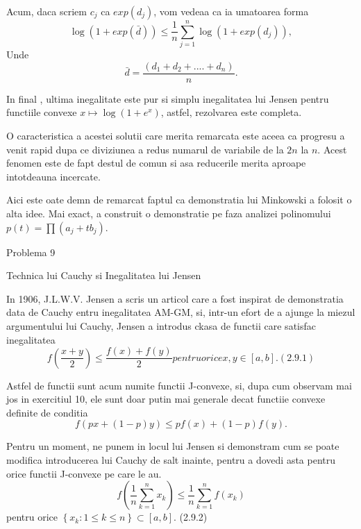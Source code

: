 \documentclass[a4paper,12pt,oneside]{report}
\begin{document}
Acum, daca scriem \(c_{j}\) ca \(exp\left (d _{j} \right )\), vom vedeaa ca ia umatoarea forma 
\begin{displaymath}
  \log\left ( 1 + exp\left ( \bar{d} \right ) \right ) \leq \frac{1}{n}\sum_{j = 1}^{n}\log\left ( 1 + exp\left ( d_{j} \right ) \right ),
\end{displaymath}
Unde 
\begin{displaymath}
  \bar{d} = \frac{\left ( d_{1} + d_{2}  + ....+ d_{n}\right )}{n}.
\end{displaymath} 

In final , ultima inegalitate este pur si simplu inegalitatea lui Jensen pentru functiile convexe \(x \mapsto \log \left ( 1 + e^{x} \right )\), astfel, rezolvarea este completa. 

O caracteristica a acestei solutii care merita remarcata este aceea ca progresu a venit rapid dupa ce diviziunea a redus numarul de variabile de la \(2n\) la \(n\). Acest fenomen este de fapt destul de comun si asa reducerile merita aproape intotdeauna incercate. 

Aici este oate demn de remarcat faptul ca demonstratia lui Minkowski a folosit o alta idee. Mai exact, a construit o demonstratie pe faza analizei polinomului \(p\left ( t \right ) = \prod \left ( a_{j}  + tb_{j}\right )\).

Problema 9 

Technica lui Cauchy si Inegalitatea lui Jensen

In 1906, J.L.W.V. Jensen a scris un articol care a fost inspirat de demonstratia data de Cauchy entru inegalitatea AM-GM, si, intr-un efort de a ajunge la miezul argumentului lui Cauchy, Jensen a introdus ckasa de functii care satisfac inegalitatea 
\begin{displaymath}
  f\left ( \frac{x + y}{2} \right ) \leq \frac{f\left ( x \right ) + f\left ( y \right )}{2} pentru orice x,y \in \left [ a, b \right ]. (2.9.1)
\end{displaymath}

Astfel de functii sunt acum numite functii J-convexe, si, dupa cum observam mai jos in exercitiul 10, ele sunt doar putin mai generale decat functiie convexe definite de conditia
\begin{displaymath}
  f\left ( px + \left ( 1 - p \right )y \right )\leq pf\left ( x \right ) + \left ( 1-p \right )f\left ( y \right ). 
\end{displaymath} 

Pentru un moment, ne punem in locul lui Jensen si demonstram cum se poate modifica introducerea lui Cauchy de salt inainte, pentru a dovedi asta pentru orice functii  J-convexe pe care le au. 
\begin{displaymath}
  f\left ( \frac{1}{n} \sum_{k = 1}^{n}x_{k}\right )\leq \frac{1}{n}\sum_{k = 1}^{n}f\left ( x_{k} \right )
\end{displaymath}
pentru orice \(\left \{ x_{k}: 1\leq k \leq n \right \} \subset \left [ a, b \right ].\) (2.9.2)
\end{document}
